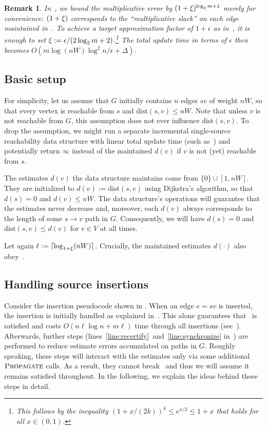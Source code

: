 \documentclass[11pt,letterpaper]{article}
\theoremstyle{plain}
\newtheorem{remark}[theorem]{Remark}
\newcommand{\eps}{\ensuremath{\epsilon}}
\newcommand{\dist}{\mathrm{dist}}
\DeclareMathOperator*{\PD}{\textsc{Propagate}}
\begin{document}
\begin{remark}\label{remark: epsp fix}
In~, we bound the multiplicative error by $(1+\xi)^{\log_2{m}+1}$ merely for
convenience: $(1+\xi)$ corresponds to the ``multiplicative slack'' on each edge maintained
in~.
  To achieve a target approximation factor of $1+\eps$ as in~, it is enough to set $\epsp:=\eps/(2\log_2{m}+2)$.\footnote{
  This follows by the inequality $(1+x/(2k))^k\leq e^{x/2}\leq 1+x$ that holds for all $x\in (0,1)$.}
The total update time in terms of $\eps$ then becomes $O(m\log(nW)\log^2{n}/\eps+\Delta)$.
\end{remark}

\subsection{Basic setup}\label{sec:setup}
For simplicity, let us assume that $G$ initially contains $n$ edges $sv$ of weight $nW$, so that every
vertex is reachable from $s$ and $\dist(s,v)\leq nW$. Note that unless $v$ is not reachable from $G$,
this assumption does not ever influence $\dist(s,v)$. To drop the assumption, we might run a separate
incremental single-source reachability data structure with linear total update time (such as~\cite{Italiano86})
and potentially return $\infty$ instead of the maintained $d(v)$ if $v$ is not (yet) reachable from $s$.

The estimates $d(v)$ the data structure maintains come from $\{0\}\cup [1,nW]$. 
They are initialized to $d(v):=\dist(s,v)$ using Dijkstra's algorithm, so that $d(s)=0$ and $d(v)\leq nW$.
The data structure's operations will guarantee that the estimates never decrease and, moreover,
each $d(v)$ always corresponds to the length of some $s\to v$ path in $G$.
Consequently, we will have $d(s)=0$ and $\dist(s,v)\leq d(v)$ for $v\in V$ at all times.

Let again ${\ell:=\lceil \log_{1+\xi}(nW)\rceil}$. 
Crucially, the maintained estimates $d(\cdot)$ also obey~.
\subsection{Handling source insertions}

Consider the insertion pseudocode shown in .
When an edge $e=sv$ is inserted, the insertion is initially handled as explained
in~.
This alone guarantees that~ is satisfied and costs $O(n\ell\log{n}+m\ell)$ time through all insertions (see~).
Afterwards, further steps (lines~\ref{line:recertify}~and~\ref{line:synchronize} in~) are performed to reduce estimate errors accumulated on paths in $G$.
Roughly speaking, these steps will interact with the estimates only via some additional $\PD$ calls. 
As a result, they cannot break~ and thus we will assume it remains satisfied throughout.
In the following, we explain the ideas behind these steps in detail.
\end{document}
